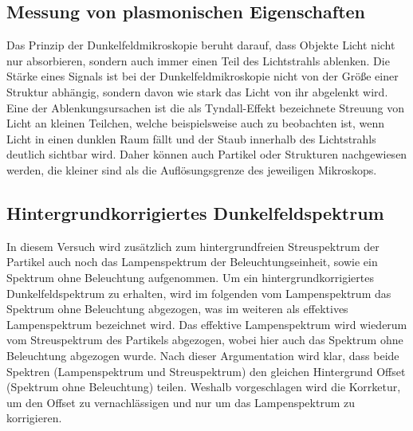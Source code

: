 \subsection{Messung von plasmonischen Eigenschaften}
\label{sub:messungEigenschaften}

Das Prinzip der Dunkelfeldmikroskopie beruht darauf, dass Objekte Licht nicht nur absorbieren, sondern auch immer einen Teil des Lichtstrahls ablenken. Die Stärke eines Signals ist bei der Dunkelfeldmikroskopie nicht von der Größe einer Struktur abhängig, sondern davon wie stark das Licht von ihr abgelenkt wird. Eine der Ablenkungsursachen ist die als Tyndall-Effekt bezeichnete Streuung von Licht an kleinen Teilchen, welche beispielsweise auch zu beobachten ist, wenn Licht in einen dunklen Raum fällt und der Staub innerhalb des Lichtstrahls deutlich sichtbar wird. Daher können auch Partikel oder Strukturen nachgewiesen werden, die kleiner sind als die Auflösungsgrenze des jeweiligen Mikroskops. \cite{WikiDunkelfeld}

\subsection{Hintergrundkorrigiertes Dunkelfeldspektrum}
\label{sub:korrigiertesSignal}

In diesem Versuch wird zusätzlich zum hintergrundfreien Streuspektrum der Partikel auch noch das Lampenspektrum der Beleuchtungseinheit, sowie ein Spektrum ohne Beleuchtung aufgenommen. Um ein hintergrundkorrigiertes Dunkelfeldspektrum zu erhalten, wird im folgenden vom Lampenspektrum das Spektrum ohne Beleuchtung abgezogen, was im weiteren als effektives Lampenspektrum bezeichnet wird. Das effektive Lampenspektrum wird wiederum vom Streuspektrum des Partikels abgezogen, wobei hier auch das Spektrum ohne Beleuchtung abgezogen wurde. Nach dieser Argumentation wird klar, dass beide Spektren (Lampenspektrum und Streuspektrum) den gleichen Hintergrund Offset (Spektrum ohne Beleuchtung) teilen. Weshalb vorgeschlagen wird die Korrketur, um den Offset zu vernachlässigen und nur um das Lampenspektrum zu korrigieren. 